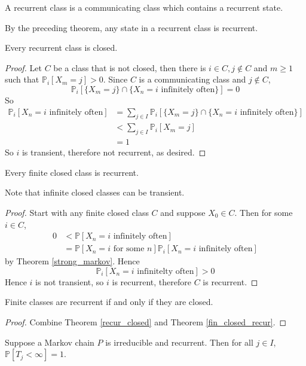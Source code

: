 \begin{definition}
    A recurrent class is a communicating class which contains a recurrent state.
\end{definition}
By the preceding theorem, any state in a recurrent class is recurrent.
\begin{theorem}\label{recur_closed}
    Every recurrent class is closed.
\end{theorem}
\begin{proof}
    Let $C$ be a class that is not closed, then there is $i\in C,j\notin C$ and $m\ge 1$ such that $\mathbb P_i[X_m=j]>0$.
    Since $C$ is a communicating class and $j\notin C$,
    $$\mathbb P_i[\{X_m=j\}\cap\{X_n=i\text{ infinitely often}\}]=0$$
    So
    \begin{align*}
        \mathbb P_i[X_n=i\text{ infinitely often}]&=\sum_{j\in I}\mathbb P_i[\{X_m=j\}\cap\{X_n=i\text{ infinitely often}\}]\\
        &<\sum_{j\in I}\mathbb P_i[X_m=j]\\
        &=1
    \end{align*}
    So $i$ is transient, therefore not recurrent, as desired.
\end{proof}
\begin{theorem}\label{fin_closed_recur}
    Every finite closed class is recurrent.
\end{theorem}
Note that infinite closed classes can be transient.
\begin{proof}
    Start with any finite closed class $C$ and suppose $X_0\in C$.
    Then for some $i\in C$,
    \begin{align*}
        0&<\mathbb P[X_n=i\text{ infinitely often}]\\
        &=\mathbb P[X_n=i\text{ for some $n$}]\mathbb P_i[X_n=i\text{ infinitely often}]
    \end{align*}
    by Theorem \ref{strong_markov}.
    Hence
    $$\mathbb P_i[X_n=i\text{ infinitelty often}]>0$$
    Hence $i$ is not transient, so $i$ is recurrent, therefore $C$ is recurrent.
\end{proof}
\begin{corollary}
    Finite classes are recurrent if and only if they are closed.
\end{corollary}
\begin{proof}
    Combine Theorem \ref{recur_closed} and Theorem \ref{fin_closed_recur}.
\end{proof}
\begin{theorem}
    Suppose a Markov chain $P$ is irreducible and recurrent.
    Then for all $j\in I$, $\mathbb P[T_j<\infty]=1$.
\end{theorem}
